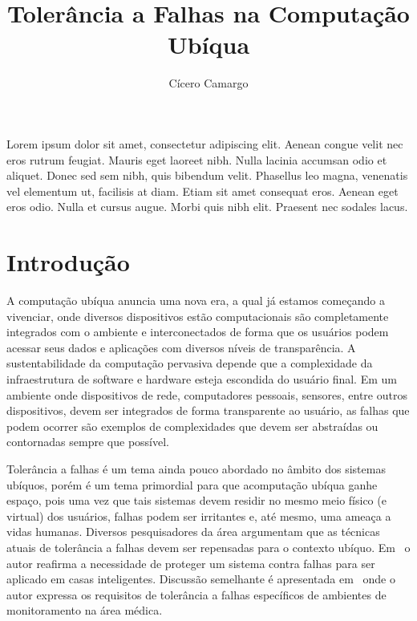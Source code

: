 \documentclass{SBCbookchapter}
\title{Tolerância a Falhas na Computação Ubíqua}
\author{Cícero Camargo}
\begin{document}
\maketitle


\begin{resumo}


Lorem ipsum dolor sit amet, consectetur adipiscing elit. Aenean congue velit nec eros rutrum feugiat. Mauris eget laoreet nibh. Nulla lacinia accumsan odio et aliquet. Donec sed sem nibh, quis bibendum velit. Phasellus leo magna, venenatis vel elementum ut, facilisis at diam. Etiam sit amet consequat eros. Aenean eget eros odio. Nulla et cursus augue. Morbi quis nibh elit. Praesent nec sodales lacus.
	

\end{resumo}

\section{Introdução} %

A computação ubíqua anuncia uma nova era, a qual já estamos começando a vivenciar, onde diversos dispositivos estão computacionais são completamente integrados com o ambiente e interconectados de forma que os usuários podem acessar seus dados e aplicações com diversos níveis de transparência. A sustentabilidade da computação pervasiva depende que a complexidade da infraestrutura de software e hardware esteja escondida do usuário final. Em um ambiente onde dispositivos de rede, computadores pessoais, sensores, entre outros dispositivos, devem ser integrados de forma transparente ao usuário, as falhas que podem ocorrer são exemplos de complexidades que devem ser abstraídas ou contornadas sempre que possível.

Tolerância a falhas é um tema ainda pouco abordado no âmbito dos sistemas ubíquos, porém é um tema primordial para que acomputação ubíqua ganhe espaço, pois uma vez que tais sistemas devem residir no mesmo meio físico (e virtual) dos usuários, falhas podem ser irritantes e, até mesmo, uma ameaça a vidas humanas. Diversos pesquisadores da área argumentam que as técnicas atuais de tolerância a falhas devem ser repensadas para o contexto ubíquo. Em~\cite{Banavar2000} o autor reafirma a necessidade de proteger um sistema contra falhas para ser aplicado em casas inteligentes. Discussão semelhante é apresentada em~\cite{Bohn02} onde o autor expressa os requisitos de tolerância a falhas específicos de ambientes de monitoramento na área médica.
\end{document}
